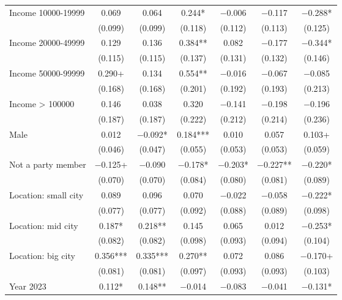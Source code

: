 \documentclass[
  letterpaper,
  DIV=11,
  numbers=noendperiod]{scrartcl}
\begin{document}
\begin{table}
\begin{tabular}[t]{lcccccc}
Income 10000-19999 & \num{0.069} & \num{0.064} & \num{0.244}* & \num{-0.006} & \num{-0.117} & \num{-0.288}*\\
 & (\num{0.099}) & (\num{0.099}) & (\num{0.118}) & (\num{0.112}) & (\num{0.113}) & (\num{0.125})\\
Income 20000-49999 & \num{0.129} & \num{0.136} & \num{0.384}** & \num{0.082} & \num{-0.177} & \num{-0.344}*\\
 & (\num{0.115}) & (\num{0.115}) & (\num{0.137}) & (\num{0.131}) & (\num{0.132}) & (\num{0.146})\\
Income 50000-99999 & \num{0.290}+ & \num{0.134} & \num{0.554}** & \num{-0.016} & \num{-0.067} & \num{-0.085}\\
 & (\num{0.168}) & (\num{0.168}) & (\num{0.201}) & (\num{0.192}) & (\num{0.193}) & (\num{0.213})\\
Income > 100000 & \num{0.146} & \num{0.038} & \num{0.320} & \num{-0.141} & \num{-0.198} & \num{-0.196}\\
 & (\num{0.187}) & (\num{0.187}) & (\num{0.222}) & (\num{0.212}) & (\num{0.214}) & (\num{0.236})\\
Male & \num{0.012} & \num{-0.092}* & \num{0.184}*** & \num{0.010} & \num{0.057} & \num{0.103}+\\
 & (\num{0.046}) & (\num{0.047}) & (\num{0.055}) & (\num{0.053}) & (\num{0.053}) & (\num{0.059})\\
Not a party member & \num{-0.125}+ & \num{-0.090} & \num{-0.178}* & \num{-0.203}* & \num{-0.227}** & \num{-0.220}*\\
 & (\num{0.070}) & (\num{0.070}) & (\num{0.084}) & (\num{0.080}) & (\num{0.081}) & (\num{0.089})\\
Location: small city & \num{0.089} & \num{0.096} & \num{0.070} & \num{-0.022} & \num{-0.058} & \num{-0.222}*\\
 & (\num{0.077}) & (\num{0.077}) & (\num{0.092}) & (\num{0.088}) & (\num{0.089}) & (\num{0.098})\\
Location: mid city & \num{0.187}* & \num{0.218}** & \num{0.145} & \num{0.065} & \num{0.012} & \num{-0.253}*\\
 & (\num{0.082}) & (\num{0.082}) & (\num{0.098}) & (\num{0.093}) & (\num{0.094}) & (\num{0.104})\\
Location: big city & \num{0.356}*** & \num{0.335}*** & \num{0.270}** & \num{0.072} & \num{0.086} & \num{-0.170}+\\
 & (\num{0.081}) & (\num{0.081}) & (\num{0.097}) & (\num{0.093}) & (\num{0.093}) & (\num{0.103})\\
Year 2023 & \num{0.112}* & \num{0.148}** & \num{-0.014} & \num{-0.083} & \num{-0.041} & \num{-0.131}*\\

\end{tabular}
\end{table}
\end{document}
